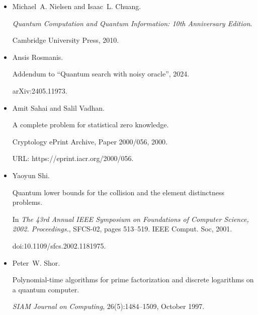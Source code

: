 \begin{itemize}
Ashley Montanaro.


Nonadaptive quantum query complexity, 2010.


arXiv:1001.0018.





\item[] 
[25]

Michael A. Nielsen and Isaac L. Chuang.


\emph{Quantum Computation and Quantum Information: 10th Anniversary
Edition}.


Cambridge University Press, 2010.





\item[] 
[26]

Ansis Rosmanis.


Addendum to “Quantum search with noisy oracle”, 2024.


arXiv:2405.11973.





\item[] 
[27]

Amit Sahai and Salil Vadhan.


A complete problem for statistical zero knowledge.


Cryptology ePrint Archive, Paper 2000/056, 2000.


URL: https://eprint.iacr.org/2000/056.





\item[] 
[28]

Yaoyun Shi.


Quantum lower bounds for the collision and the element distinctness
problems.


In \emph{The 43rd Annual IEEE Symposium on Foundations of Computer
Science, 2002. Proceedings.}, SFCS-02, pages 513–519. IEEE Comput. Soc,
2001.


doi:10.1109/sfcs.2002.1181975.





\item[] 
[29]

Peter W. Shor.


Polynomial-time algorithms for prime factorization and discrete
logarithms on a quantum computer.


\emph{SIAM Journal on Computing}, 26(5):1484–1509, October 1997.



\end{itemize}
